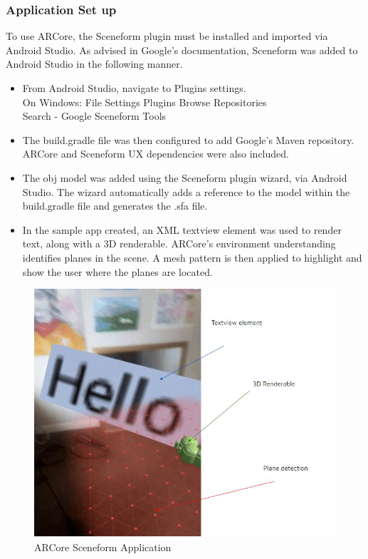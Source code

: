 \subsubsection{Application Set up}
To use ARCore, the Sceneform plugin must be installed and imported via Android Studio. As advised in Google’s documentation, Sceneform was added to Android Studio in the following manner.

\begin{itemize}
  \item From Android Studio, navigate to Plugins settings. \\
  On Windows: File \rightarrow  Settings \rightarrow Plugins \rightarrow Browse Repositories
  \\
  \rightarrow Search -  Google Sceneform Tools
 
  \item The build.gradle file was then configured to add Google’s Maven repository. ARCore and Sceneform UX dependencies were also included.
  
  \item
    The obj model was added using the Sceneform plugin wizard, via Android Studio. The wizard automatically adds a reference to the model within the build.gradle file and generates the .sfa file. 
    
    \item In the sample app created, an XML textview element was used to render text, along with a 3D renderable. ARCore’s environment understanding identifies planes in the scene. A mesh pattern is then applied to highlight and show the user where the planes are located.

\end{itemize}

\begin{figure}[!ht]
\caption{ARCore Sceneform Application}
\centering
\includegraphics[width=1\textwidth]{images/sceneform_app.JPG}
\end{figure}



